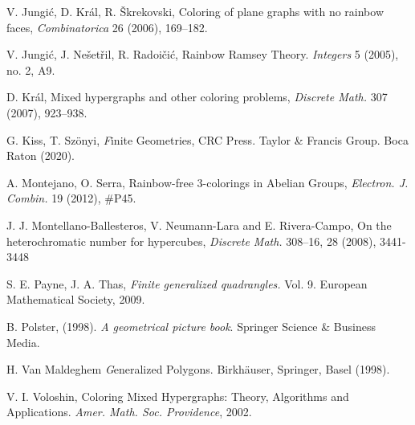 \documentclass[12pt]{article}
\begin{document}
\begin{thebibliography}{}
 V. Jungi\'c, D. Kr\'{a}l, R. \v Skrekovski, Coloring of plane graphs with no rainbow faces, 
\emph{Combinatorica} 26 (2006), 169--182.

 V. Jungi\'c, J. Ne\v set\v ril, R. Radoi\v ci\'c, Rainbow Ramsey Theory. \emph{ Integers} 5 (2005), no. 2, A9.

 D. Kr\'{a}l, Mixed hypergraphs and other coloring problems,
\emph{Discrete Math.} 307 (2007), 923--938.

 G. Kiss, T. Szönyi, {\textit Finite Geometries}, CRC Press. Taylor \& Francis Group. Boca Raton (2020).

 A. Montejano, O. Serra, 
Rainbow-free 3-colorings in Abelian Groups, \emph{Electron. J. Combin.} 19 (2012), \#P45.

 J. J. Montellano-Ballesteros, V. Neumann-Lara and E. Rivera-Campo, On the heterochromatic number for hypercubes, \emph{Discrete Math.} 308--16, 28 (2008), 3441-3448

 S. E. Payne, J. A. Thas, {\textit {Finite generalized quadrangles.}} Vol. 9. European Mathematical Society, 2009.

 B. Polster,  (1998). {\textit {A geometrical picture book}}. Springer Science \& Business Media.

 H. Van Maldeghem {\textit Generalized Polygons}. Birkh\"auser, Springer, Basel (1998).

  V. I. Voloshin, 
Coloring Mixed Hypergraphs: Theory, Algorithms and Applications. 
\emph{Amer. Math. Soc. Providence}, 2002.

\end{thebibliography}
\end{document}

